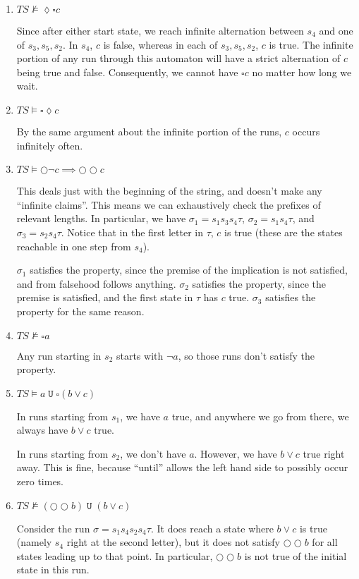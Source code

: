 \documentclass[letterpaper,11pt]{article}
\newcommand{\eventually}{\lozenge}
\newcommand{\always}{\square}
\newcommand{\nmodels}{\nvDash}
\newcommand{\step}{\bigcirc}
\DeclareMathOperator{\untilOp}{\mathtt{U}}
\newcommand{\until}{\untilOp{}}
\begin{document}
\begin{enumerate}
    \item $TS \nmodels \eventually \always c$

        Since after either start state, we reach infinite alternation between
        $s_4$ and one of $s_3, s_5, s_2$. In $s_4$, $c$ is false, whereas in
        each of $s_3, s_5, s_2$, $c$ is true. The infinite portion of any run
        through this automaton will have a strict alternation of $c$ being true
        and false. Consequently, we cannot have $\always c$ no matter how long
        we wait.

    \item $TS \models \always \eventually c$

        By the same argument about the infinite portion of the runs, $c$ occurs
        infinitely often.

    \item $TS \models \step \neg c \implies \step \step c$

        This deals just with the beginning of the string, and doesn't make any
        ``infinite claims''.
        This means we can exhaustively check the prefixes of relevant lengths.
        In particular, we have $\sigma_1 = s_1 s_3 s_4 \tau$,
        $\sigma_2 = s_1 s_4 \tau$, and $\sigma_3 = s_2 s_4 \tau$. Notice that
        in the first letter in $\tau$, $c$ is true (these are the states
        reachable in one step from $s_4$).

        $\sigma_1$ satisfies the property, since the premise of the implication
        is not satisfied, and from falsehood follows anything.
        $\sigma_2$ satisfies the property, since the premise is satisfied, and
        the first state in $\tau$ has $c$ true.
        $\sigma_3$ satisfies the property for the same reason.

    \item $TS \nmodels \always a$

        Any run starting in $s_2$ starts with $\neg a$, so those runs don't
        satisfy the property.

    \item $TS \models a \until \always (b \lor c)$

        In runs starting from $s_1$, we have $a$ true, and anywhere we go from
        there, we always have $b \lor c$ true.

        In runs starting from $s_2$, we don't have $a$. However, we have
        $b \lor c$ true right away. This is fine, because ``until'' allows the
        left hand side to possibly occur zero times.

    \item $TS \nmodels (\step \step b) \until (b \lor c)$

        Consider the run $\sigma = s_1 s_4 s_2 s_4 \tau$. It does reach a state
        where $b \lor c$ is true (namely $s_4$ right at the second letter), but
        it does not satisfy $\step \step b$ for all states leading up to that
        point. In particular, $\step \step b$ is not true of the initial state
        in this run.
\end{enumerate}
\end{document}
